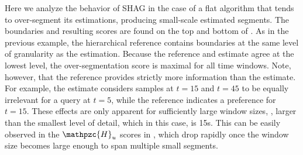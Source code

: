\documentclass{article}
\def\shag{\ensuremath{\mathpzc{H}}}
\begin{document}
Here we analyze the behavior of SHAG in the case of a flat algorithm that tends to over-segment its estimations, producing small-scale estimated segments.
The boundaries and resulting scores are found on the top and bottom of .
As in the previous example, the hierarchical reference contains boundaries at the same level of granularity as the estimation. 
Because the reference and estimate agree at the lowest level, the over-segmentation score is maximal for all time windows.
Note, however, that the reference provides strictly more information than the estimate.  For example, the estimate considers samples at $t=15$ and $t=45$ to be equally irrelevant for a 
query at $t=5$, while the reference indicates a preference for $t=15$.  These effects are only apparent for sufficiently large window sizes, \eg, larger than the smallest level of
detail, which in this case, is 15s.  This can be easily observed in the $\shag_u$
scores in , which drop rapidly once the window size becomes
large enough to span multiple small segments.
\end{document}
